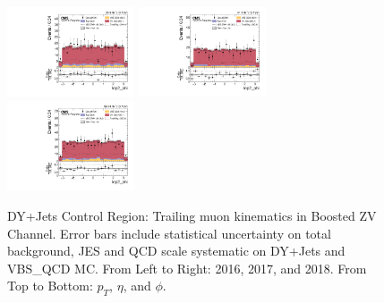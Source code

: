 \begin{figure}[!ht]
  \includegraphics[width=0.335\textwidth]{analysis_plots/2016_zv/cr_vjets_m/lep2_phi.pdf} \hspace{-10pt}
  \includegraphics[width=0.335\textwidth]{analysis_plots/2017_zv/cr_vjets_m/lep2_phi.pdf} \hspace{-10pt}
  \includegraphics[width=0.335\textwidth]{analysis_plots/2018_zv/cr_vjets_m/lep2_phi.pdf} \hspace{-10pt} \\
  \caption[DY+Jets Control Region: Trailing muon kinematics in Boosted ZV Channel]%
  {DY+Jets Control Region: Trailing muon kinematics in Boosted ZV Channel.
    Error bars include statistical uncertainty on total background,
    JES and QCD scale systematic on DY+Jets and VBS\_QCD MC\@. From Left to Right: 2016,
    2017, and 2018. From Top to Bottom: \( p_T \), \( \eta \), and \( \phi \).}%
  \label{fig:zv-cr-vjets-m-lep2-pt-eta-phi}
\end{figure}

